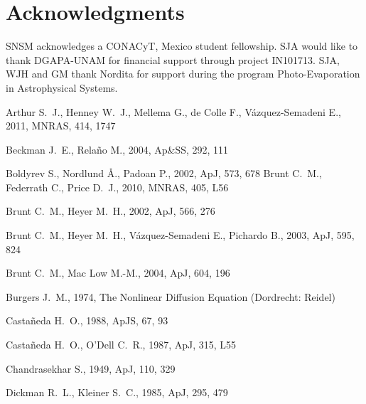 \documentclass[useAMS,usenatbib]{mn2e}
\begin{document}
\section*{Acknowledgments}
SNSM acknowledges a CONACyT, Mexico student fellowship. SJA would like to thank
DGAPA-UNAM for financial support through project IN101713. SJA, WJH
and GM thank Nordita for support during the program Photo-Evaporation
in Astrophysical Systems.


\begin{thebibliography}{}
Arthur S.~J., Henney W.~J., Mellema G., de Colle F., V{\'a}zquez-Semadeni 
E., 2011, MNRAS, 414, 1747 

 Beckman J.~E., Rela{\~n}o M., 2004, Ap\&SS, 292, 111 

 Boldyrev S., Nordlund {\AA}., Padoan P., 2002, ApJ, 573, 678 
 Brunt C.~M., Federrath C., Price D.~J., 2010, MNRAS, 405, L56 

 Brunt C.~M., Heyer M.~H., 2002, ApJ, 566, 276 

Brunt C.~M., Heyer M.~H., V{\'a}zquez-Semadeni E., Pichardo B., 2003, ApJ, 
595, 824 

 Brunt C.~M., Mac Low M.-M., 2004, ApJ, 604, 196 


 Burgers
  J.~M., 1974, The Nonlinear Diffusion Equation (Dordrecht: Reidel)

Casta\~neda H.~O., 1988, ApJS, 67, 93 

 Casta\~neda H.~O., O'Dell C.~R., 1987, ApJ, 315, L55 

Chandrasekhar S., 1949, ApJ, 110, 329 

 Dickman R.~L., Kleiner S.~C., 1985, ApJ, 295, 479 


\end{thebibliography}
\end{document}
